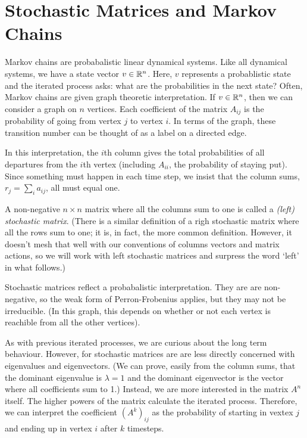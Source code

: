 \documentclass[fleqn]{report}
\begin{document}
\section{Stochastic Matrices and Markov Chains}

Markov chains are probabalistic linear dynamical systems.
Like all dynamical systems, we have a state vector $v \in
\mathbb{R}^n$. Here, $v$ represents a probablistic state and the
iterated process asks: what are the probabilities in the next
state? Often, Markov chains are given graph theoretic
interpretation. If $v \in \mathbb{R}^n$, then we can consider a graph
on $n$ vertices. Each coefficient of the matrix $A_{ij}$ is
the probability of going from vertex $j$ to vertex $i$. In
terms of the graph, these transition number can be thought of
as a label on a directed edge.

In this interpretation, the $i$th column gives the total
probabilities of all departures from the $i$th vertex
(including $A_{ii}$, the probability of staying put). Since
something must happen in each time step, we insist that the
column sums, $r_j = \sum_i a_{ij}$, all must equal one. 

\begin{defn}
A non-negative $n \times n$ matrix where all the columns sum
to one is called a \emph{(left) stochastic matrix}. (There is
a similar definition of a righ stochastic matrix where all the
rows sum to one; it is, in fact, the more common definition.
However, it doesn't mesh that well with our conventions of
columns vectors and matrix actions, so we will work with left
stochastic matrices and surpress the word `left' in what
follows.)
\end{defn}

Stochastic matrices reflect a probabalistic interpretation.
They are are non-negative, so the weak form of Perron-Frobenius
applies, but they may not be irreducible. (In this graph,
this depends on whether or not each vertex is reachible from
all the other vertices).

As with previous iterated processes, we are curious about the
long term behaviour. However, for stochastic matrices are are
less directly concerned with eigenvalues and eigenvectors.
(We can prove, easily from the column sums, that the dominant
eigenvalue is $\lambda = 1$ and the dominant eigenvector is
the vector where all coefficients sum to 1.) Instead, we are more
interested in the matrix $A^n$ itself. The higher powers of
the matrix calculate the iterated process. Therefore, we can
interpret the coefficient $(A^k)_{ij}$ as the probability of
starting in vextex $j$ and ending up in vertex $i$ after $k$
timesteps.
\end{document}
